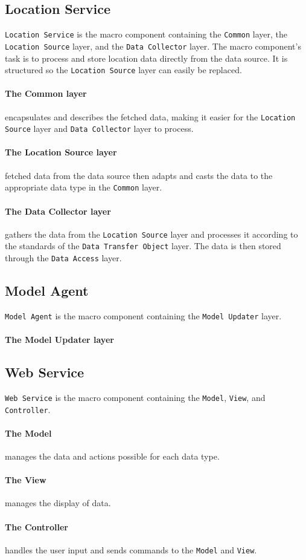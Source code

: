 \subsection*{Location Service}\texttt{Location Service} is the macro component containing the \texttt{Common} layer, the \texttt{Location Source} layer, and the \texttt{Data Collector} layer.
The macro component's task is to process and store location data directly from the data source. It is structured so the \texttt{Location Source} layer can easily be replaced.

\paragraph{The Common layer} encapsulates and describes the fetched data, making it easier for the \texttt{Location Source} layer and \texttt{Data Collector} layer to process.

\paragraph{The Location Source layer} fetched data from the data source then adapts and casts the data to the appropriate data type in the \texttt{Common} layer.

\paragraph{The Data Collector layer} gathers the data from the \texttt{Location Source} layer and processes it according to the standards of the \texttt{Data Transfer Object} layer. The data is then stored through the \texttt{Data Access} layer.


\subsection*{Model Agent}\texttt{Model Agent} is the macro component containing the \texttt{Model Updater} layer.

\paragraph{The Model Updater layer}


\subsection*{Web Service}\texttt{Web Service} is the macro component containing the \texttt{Model}, \texttt{View}, and \texttt{Controller}.

\paragraph{The Model} manages the data and actions possible for each data type.

\paragraph{The View} manages the display of data.

\paragraph{The Controller} handles the user input and sends commands to the \texttt{Model} and \texttt{View}.